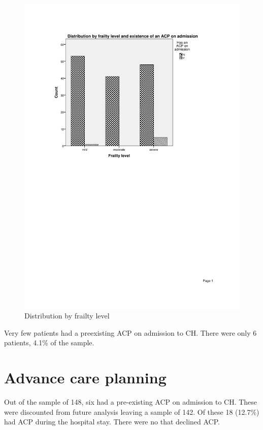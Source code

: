 \documentclass
[
	12pt,
	a4paper,
	oneside,
]{report}
\begin{document}
\begin{figure}[ht]
\caption{Distribution by frailty level}
\label{fig:chart-dist-frailty-level}
\includegraphics[width=\textwidth,
	trim={2.5cm 14cm 2.5cm 2.5cm},
	clip]{media/chart-dist-frailty-level}
\end{figure}


Very few patients had a preexisting ACP on admission to CH. There were only 6
patients, 4.1\% of the sample.


\section{Advance care planning}

Out of the sample of 148, six had a pre-existing ACP on admission to CH. These 
were discounted from future analysis leaving a sample of 142. Of these 18 
(12.7\%) had ACP during the hospital stay. There were no that declined ACP.
\end{document}
